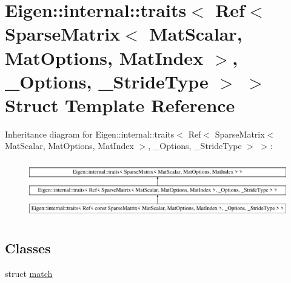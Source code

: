 \hypertarget{struct_eigen_1_1internal_1_1traits_3_01_ref_3_01_sparse_matrix_3_01_mat_scalar_00_01_mat_optionsa860cad8c30d0eada972a685a49da86f}{}\section{Eigen\+::internal\+::traits$<$ Ref$<$ Sparse\+Matrix$<$ Mat\+Scalar, Mat\+Options, Mat\+Index $>$, \+\_\+\+Options, \+\_\+\+Stride\+Type $>$ $>$ Struct Template Reference}
\label{struct_eigen_1_1internal_1_1traits_3_01_ref_3_01_sparse_matrix_3_01_mat_scalar_00_01_mat_optionsa860cad8c30d0eada972a685a49da86f}
Inheritance diagram for Eigen\+::internal\+::traits$<$ Ref$<$ Sparse\+Matrix$<$ Mat\+Scalar, Mat\+Options, Mat\+Index $>$, \+\_\+\+Options, \+\_\+\+Stride\+Type $>$ $>$\+:\begin{figure}[H]
\begin{center}
\leavevmode
\includegraphics[height=2.541604cm]{struct_eigen_1_1internal_1_1traits_3_01_ref_3_01_sparse_matrix_3_01_mat_scalar_00_01_mat_optionsa860cad8c30d0eada972a685a49da86f}
\end{center}
\end{figure}
\subsection*{Classes}
\begin{DoxyCompactItemize}
\item 
struct \mbox{\hyperlink{struct_eigen_1_1internal_1_1traits_3_01_ref_3_01_sparse_matrix_3_01_mat_scalar_00_01_mat_optionsc6ef0ce4e339306d76a1e27f17721ded}{match}}
\end{DoxyCompactItemize}
